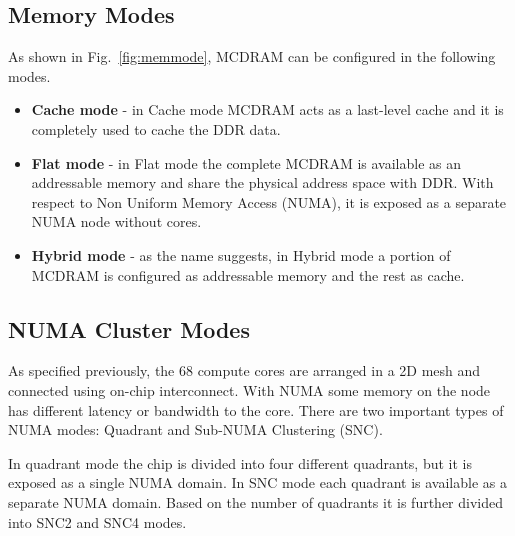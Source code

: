 \subsection{Memory Modes}
\label{src:knl/config}
As shown in Fig.~\ref{fig:memmode}, MCDRAM can be configured in the
following modes.
\begin{itemize}
    \item \textbf{Cache mode} - in Cache mode
    MCDRAM acts as a last-level cache and it is completely used to
    cache the DDR data. %
    \item \textbf{Flat mode} - in Flat mode the complete
    MCDRAM is available as an addressable memory and share the
    physical address space with DDR. With respect to Non Uniform
    Memory Access (NUMA), it is exposed as a separate NUMA node
    without cores.%
    \item \textbf{Hybrid mode} - as the name suggests, in
    Hybrid mode a portion of MCDRAM is configured as addressable
    memory and the rest as cache.
\end{itemize}

\subsection{NUMA Cluster Modes}
\label{src:knl/cluster}
As specified previously, the 68 compute cores are arranged in a 2D
mesh and connected using on-chip interconnect. With NUMA some memory
on the node has different latency or bandwidth to the core. %
There are two important types of NUMA modes: Quadrant and
Sub-NUMA Clustering (SNC).

In quadrant mode the chip is divided into four different quadrants, but
it is exposed as a single NUMA domain. In SNC mode each quadrant is
available as a separate NUMA domain. Based on the number of quadrants
it is further divided into SNC2 and SNC4 modes.
